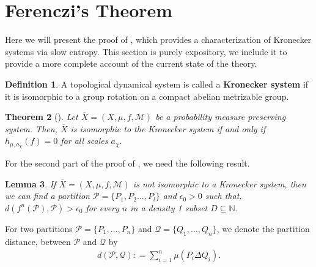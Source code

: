\documentclass[oneside]{amsart}
\theoremstyle{plain}
\newtheorem{THM}{Theorem}[section]
\newtheorem{LEM}[THM]{Lemma}
\theoremstyle{definition}
\newtheorem{DEF}[THM]{Definition}
\newcommand{\dfn}{\mathrel{\mathop:}=}
\newcommand{\<}{\langle}
\renewcommand{\>}{\rangle}
\renewcommand{\P}{\mathcal{P}}
\newcommand{\e}{\epsilon}
\renewcommand{\bar}{\overline}
\renewcommand{\|}{|\!|} %
\begin{document}
\section{Ferenczi's Theorem}
\label{sec:ferenczi}

Here we will present the proof of \cite[Proposition 3]{Ferenczi0}, which provides a characterization of Kronecker systems via slow entropy. This section is purely expository, we include it to provide a more complete account of the current state of the theory.

\begin{DEF}
A topological dynamical system is called a {\bf Kronecker system} if it is isomorphic to a group rotation on a compact abelian metrizable group. 
\end{DEF}


\begin{THM}[\cite{Ferenczi0}]
 Let $\bar{X}=(X,\mu,f,\mathcal{M})$ be a probability measure preserving system. Then, $\bar{X}$ is isomorphic to the Kronecker system if and only if $h_{\mu,a_\chi}(f)=0$ for all scales $a_\chi.$
 \label{thm:Ferenczi}
\end{THM}


For the second part of the proof of , we need the following result. 


\begin{LEM}
\label{almost periodic function}
If $\bar{X}=(X,\mu,f,\mathcal{M})$ is not isomorphic to a Kronecker system, then we can find a partition $\P=\{P_1,P_2...,P_{l}\}$ and $\e_0>0$ such that, $d(f^n(\P),\P)>\e_0$ for every $n$ in a density 1 subset $D \subseteq \mathbb{N}$. 
\end{LEM}

For two partitions $\P=\{P_1,\dots,P_n\}$ and $\mathcal{Q}= \{Q_1,\dots,Q_n\}$, we denote the {partition distance}, between $\P$ and $\mathcal{Q}$  by 
\begin{align*}
    d(\P,\mathcal{Q})\dfn\displaystyle\sum_{i=1}^n \mu(P_i\Delta Q_i).
\end{align*}
\end{document}
